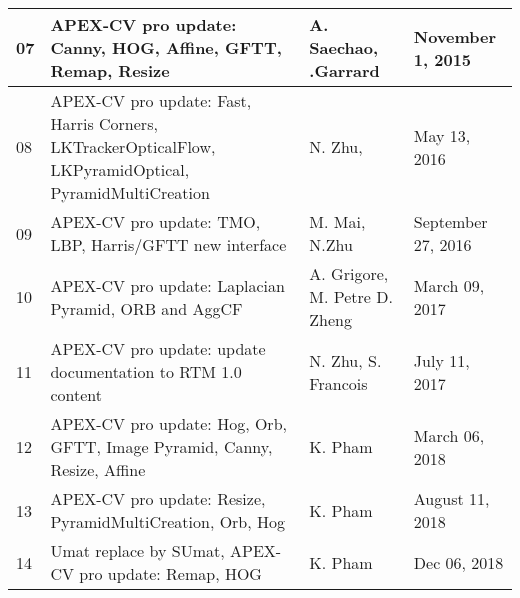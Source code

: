 \documentclass[oneside]{book}
\newcommand{\+}{\discretionary{\mbox{\scriptsize$\hookleftarrow$}}{}{}}
\begin{document}
\begin{table}[h]
\begin{tabular}{|p{1cm}|p{8cm}|p{2.5cm}|p{2.5cm}|}
07                                                             & APEX-CV pro update: Canny, HOG, Affine, GFTT, Remap, Resize                                                               & A. Saechao, \newline .Garrard                                 & November 1, 2015                                            \\ \hline
08                                                             & APEX-CV pro update: Fast, Harris Corners, LKTrackerOpticalFlow, LKPyramidOptical, PyramidMultiCreation                    & N. Zhu,                                                       & May 13, 2016                                                \\ \hline
09                                                             & APEX-CV pro update: TMO, LBP, Harris/GFTT new interface                                                                        & M. Mai, \newline N.Zhu                                   & September 27, 2016                                          \\ \hline
10                                                             & APEX-CV pro update: Laplacian Pyramid, ORB and AggCF                                                                        & A. Grigore, \newline M. Petre \newline D. Zheng             & March 09, 2017                                              \\ \hline
11                                                             & APEX-CV pro update: update documentation to RTM 1.0 content                                                               & N. Zhu, \newline S. Francois                                  & July 11, 2017                                               \\ \hline
12                                                             & APEX-CV pro update: Hog, Orb, GFTT, Image Pyramid, Canny, Resize, Affine                                                  & K. Pham                                                 & March 06, 2018                                               \\ \hline
13                                                             & APEX-CV pro update: Resize, PyramidMultiCreation, Orb, Hog                                                  & K. Pham                                                & August 11, 2018                                               \\ \hline
14                                                             & Umat replace by SUmat, APEX-CV pro update: Remap, HOG                                                  & K. Pham                                                & Dec 06, 2018                                               \\ \hline
\end{tabular}
\end{table}
\renewcommand{\arraystretch}{1}
\end{document}
